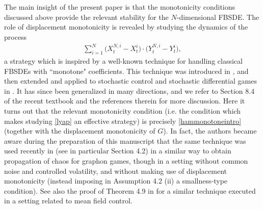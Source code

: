 \documentclass[11pt,reqno]{amsart}
\numberwithin{equation}{section}
\theoremstyle{definition}
\begin{document}
The main insight of the present paper is that the monotonicity conditions discussed above provide the relevant stability for the $N$-dimensional FBSDE. The role of displacement monotonicity is revealed by studying the dynamics of the process 
\begin{align} \label{lyap}
\sum_{i = 1}^N \big(X_t^{N,i} - X_t^{i} \big) \cdot \big(Y_t^{N,i} - Y_t^{i} \big), 
\end{align}
a strategy which is inspired by a well-known technique for handling classical FBSDEs with ``monotone" coefficients. This technique was introduced in \cite{hupengmonotone}, and then extended and applied to stochastic control and stochastic differential games in \cite{pengwumonotone}. It has since been generalized in many directions, and we refer to Section 8.4 of the recent textbook \cite{Zhang} and the references therein for more discussion. Here it  turns out that the relevant monotonicity condition (i.e. the condition which makes studying \eqref{lyap} an effective strategy) is precisely \eqref{hammonotoneintro} (together with the displacement monotonicity of $G$). In fact, the authors became aware during the preparation of this manuscript that the same technique was used recently in \cite{bayraktar2022propagation} (see in particular Section 4.2) in a similar way to obtain propagation of chaos for graphon games, though in a setting without common noise and controlled volatility, and without making use of displacement monotonicity (instead imposing in Assumption 4.2 (ii) a smallness-type condition). See also the proof of Theorem 4.9 in \cite{jacksonlacker} for a similar technique executed in a setting related to mean field control.
\end{document}
